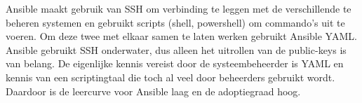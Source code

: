 Ansible maakt gebruik van SSH om verbinding te leggen met de verschillende te beheren systemen en gebruikt scripts (shell, powershell) om commando's uit te voeren. Om deze twee met elkaar samen te laten werken gebruikt Ansible YAML. Ansible gebruikt SSH onderwater, dus alleen het uitrollen van de public-keys is van belang. De eigenlijke kennis vereist door de systeembeheerder is YAML en kennis van een scriptingtaal die toch al veel door beheerders gebruikt wordt. Daardoor is de leercurve voor Ansible laag en de adoptiegraad hoog.

